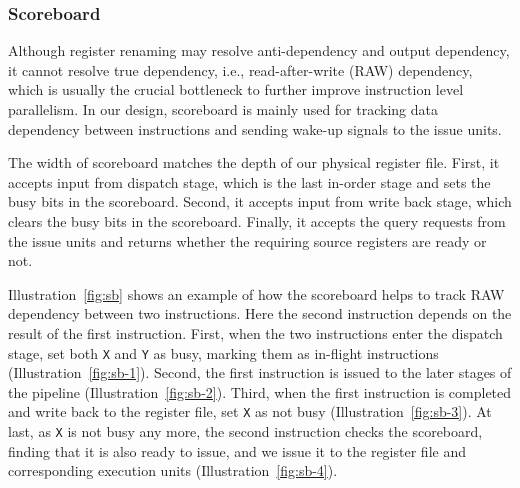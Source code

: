 \subsubsection{Scoreboard} %
Although register renaming may resolve anti-dependency and output dependency, it cannot resolve true dependency, i.e., read-after-write (RAW) dependency, which is usually the crucial bottleneck to further improve instruction level parallelism. In our design, scoreboard is mainly used for tracking data dependency between instructions and sending wake-up signals to the issue units.

The width of scoreboard matches the depth of our physical register file. First, it accepts input from dispatch stage, which is the last in-order stage and sets the busy bits in the scoreboard. Second, it accepts input from write back stage, which clears the busy bits in the scoreboard. Finally, it accepts the query requests from the issue units and returns whether the requiring source registers are ready or not.

Illustration~\ref{fig:sb} shows an example of how the scoreboard helps to track RAW dependency between two instructions. Here the second instruction depends on the result of the first instruction. First, when the two instructions enter the dispatch stage, set both \texttt{X} and \texttt{Y} as busy, marking them as in-flight instructions (Illustration~\ref{fig:sb-1}). Second, the first instruction is issued to the later stages of the pipeline (Illustration~\ref{fig:sb-2}). Third, when the first instruction is completed and write back to the register file, set \texttt{X} as not busy (Illustration~\ref{fig:sb-3}). At last, as \texttt{X} is not busy any more, the second instruction checks the scoreboard, finding that it is also ready to issue, and we issue it to the register file and corresponding execution units (Illustration~\ref{fig:sb-4}).

